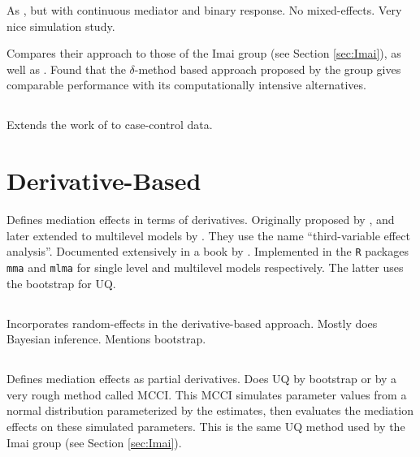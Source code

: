 \documentclass{article}
\begin{document}
As \citet{Sam18}, but with continuous mediator and binary response. No mixed-effects. Very nice simulation study.

Compares their approach to those of the Imai group (see Section \ref{sec:Imai}), as well as \citet{Lan12}. Found that the $\delta$-method based approach proposed by the \citeauthor{Sam23} group gives comparable performance with its computationally intensive alternatives.

\subsection{\citet{Cau24}}

Extends the work of \citet{Sam23} to case-control data.


\section{Derivative-Based}
\label{sec:deriv}

Defines mediation effects in terms of derivatives. Originally proposed by \citet{Yu14}, and later extended to multilevel models by \citet{Yu20}. They use the name ``third-variable effect analysis''. Documented extensively in a book by \citet{Yu22}. Implemented in the \texttt{R} packages \texttt{mma} and \texttt{mlma} for single level and multilevel models respectively. The latter uses the bootstrap for UQ.

\subsection{\citet{Mar24}}

Incorporates random-effects in the derivative-based approach. Mostly does Bayesian inference. Mentions bootstrap.

\subsection{\citet{Gel18}}

Defines mediation effects as partial derivatives. Does UQ by bootstrap or by a very rough method called MCCI. This MCCI simulates parameter values from a normal distribution parameterized by the estimates, then evaluates the mediation effects on these simulated parameters. This is the same UQ method used by the Imai group (see Section \ref{sec:Imai}).


\subsection{\citet{Dor22}}
\end{document}
